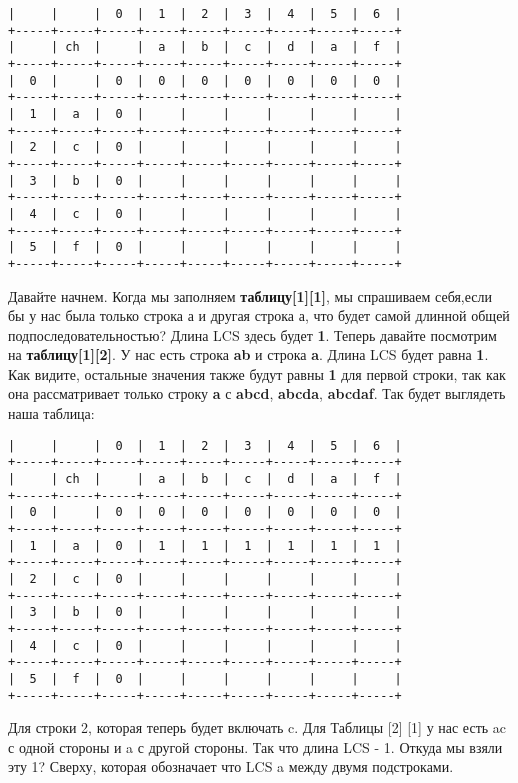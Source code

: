 \begin{tcolorbox}
\begin{verbatim}
|     |     |  0  |  1  |  2  |  3  |  4  |  5  |  6  |
+-----+-----+-----+-----+-----+-----+-----+-----+-----+
|     | ch  |     |  a  |  b  |  c  |  d  |  a  |  f  |
+-----+-----+-----+-----+-----+-----+-----+-----+-----+
|  0  |     |  0  |  0  |  0  |  0  |  0  |  0  |  0  |
+-----+-----+-----+-----+-----+-----+-----+-----+-----+
|  1  |  a  |  0  |     |     |     |     |     |     |
+-----+-----+-----+-----+-----+-----+-----+-----+-----+
|  2  |  c  |  0  |     |     |     |     |     |     |
+-----+-----+-----+-----+-----+-----+-----+-----+-----+
|  3  |  b  |  0  |     |     |     |     |     |     |
+-----+-----+-----+-----+-----+-----+-----+-----+-----+
|  4  |  c  |  0  |     |     |     |     |     |     |
+-----+-----+-----+-----+-----+-----+-----+-----+-----+
|  5  |  f  |  0  |     |     |     |     |     |     |
+-----+-----+-----+-----+-----+-----+-----+-----+-----+
\end{verbatim}
\end{tcolorbox}
\vspace{\baselineskip}
Давайте начнем. Когда мы заполняем \textbf{таблицу[1][1]}, мы спрашиваем
себя,если бы у нас была только строка а и другая строка а, что будет самой
длинной общей подпоследовательностью? Длина LCS здесь будет \textbf{1}. Теперь
давайте посмотрим на \textbf{таблицу[1][2]}. У нас есть строка \textbf{ab} и строка \textbf{a}. Длина
LCS будет равна \textbf{1}. Как видите, остальные значения также будут равны \textbf{1} для
первой строки, так как она рассматривает только строку \textbf{a} с \textbf{abcd}, \textbf{abcda},
\textbf{abcdaf}. Так будет выглядеть наша таблица:
\vspace{\baselineskip}
\begin{tcolorbox}
\begin{verbatim}
|     |     |  0  |  1  |  2  |  3  |  4  |  5  |  6  |
+-----+-----+-----+-----+-----+-----+-----+-----+-----+
|     | ch  |     |  a  |  b  |  c  |  d  |  a  |  f  |
+-----+-----+-----+-----+-----+-----+-----+-----+-----+
|  0  |     |  0  |  0  |  0  |  0  |  0  |  0  |  0  |
+-----+-----+-----+-----+-----+-----+-----+-----+-----+
|  1  |  a  |  0  |  1  |  1  |  1  |  1  |  1  |  1  |
+-----+-----+-----+-----+-----+-----+-----+-----+-----+
|  2  |  c  |  0  |     |     |     |     |     |     |
+-----+-----+-----+-----+-----+-----+-----+-----+-----+
|  3  |  b  |  0  |     |     |     |     |     |     |
+-----+-----+-----+-----+-----+-----+-----+-----+-----+
|  4  |  c  |  0  |     |     |     |     |     |     |
+-----+-----+-----+-----+-----+-----+-----+-----+-----+
|  5  |  f  |  0  |     |     |     |     |     |     |
+-----+-----+-----+-----+-----+-----+-----+-----+-----+
\end{verbatim}
\end{tcolorbox}
\vspace{\baselineskip}
Для строки 2, которая теперь будет включать c. Для Таблицы [2] [1] у нас есть
ac с одной стороны и a с другой стороны. Так что длина LCS - 1. Откуда мы
взяли эту 1? Сверху, которая обозначает что LCS a между двумя подстроками.

